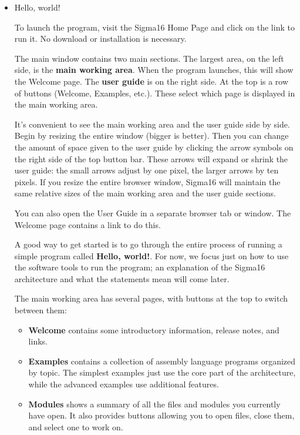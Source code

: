 \documentclass[11pt]{article}
\begin{document}
\begin{itemize}
\item Hello, world!
\label{sec:org1f781b7}

To launch the program, visit the Sigma16 Home Page and click on the
link to run it.  No download or installation is necessary.

The main window contains two main sections.  The largest area, on the
left side, is the \textbf{main working area}.  When the program launches,
this will show the Welcome page.  The \textbf{user guide} is on the right
side.  At the top is a row of buttons (Welcome, Examples, etc.).
These select which page is displayed in the main working area.

It's convenient to see the main working area and the user guide side
by side.  Begin by resizing the entire window (bigger is better).
Then you can change the amount of space given to the user guide by
clicking the arrow symbols on the right side of the top button bar.
These arrows will expand or shrink the user guide: the small arrows
adjust by one pixel, the larger arrows by ten pixels.  If you resize
the entire browser window, Sigma16 will maintain the same relative
sizes of the main working area and the user guide sections.

You can also open the User Guide in a separate browser tab or window.
The Welcome page contains a link to do this.

A good way to get started is to go through the entire process of
running a simple program called \textbf{Hello, world!}.  For now, we focus
just on how to use the software tools to run the program; an
explanation of the Sigma16 architecture and what the statements mean
will come later.

The main working area has several pages, with buttons at the top to
switch between them:

\begin{itemize}
\item \textbf{\textbf{Welcome}} contains some introductory information, release notes,
and links.

\item \textbf{\textbf{Examples}} contains a collection of assembly language programs
organized by topic.  The simplest examples just use the core part of
the architecture, while the advanced examples use additional
features.

\item \textbf{\textbf{Modules}} shows a summary of all the files and modules you
currently have open.  It also provides buttons allowing you to open
files, close them, and select one to work on.


\end{itemize}
\end{itemize}
\end{document}
